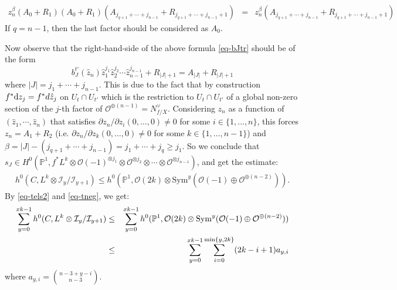 \documentclass[12pt]{amsart}
\theoremstyle{definition}
\def\min{{\rm min}}
\def\dif{{\rm d}}
\def\sym{{\rm Sym}}
\newcommand{\IP}{{\mathbb P}}
\newcommand{\CF}{{\mathcal F}}
\newcommand{\CI}{{\mathcal I}}
\newcommand{\CO}{{\mathcal O}}
\newcommand{\lee}{\leqslant}
\begin{document}
\begin{eqnarray*}\label{eq-bJ2}
    z_n^\beta (A_0+R_1)(A_0+R_1)(A_{j_{q+1}+\cdots+j_{n-1}}+R_{j_{q+1}+\cdots+j_{n-1}+1})
    &=& z_n^\beta (A_{j_{q+1}+\cdots+j_{n-1}}+R_{j_{q+1}+\cdots+j_{n-1}+1})
\end{eqnarray*}
If $q=n-1$, then the last factor should be considered as $A_0$. 

Now observe that the right-hand-side of the above formula \eqref{eq-bJtr} should be of the form $$b_{J}^{t'}(\hat{z}_n)\hat{z}_1^{j_1}\hat{z}_2^{j_2}\cdots \hat{z}_{n-1}^{j_{n-1}}+R_{|J|+1}=A_{|J|}+R_{|J|+1}$$
where $|J|=j_1+\cdots+j_{n-1}$. 
This is due to the fact that by construction $f^* \dif z_j=f^* d\hat{z}_j$ on $U_t\cap U_{t'}$ which is the restriction to $U_t\cap U_{t'}$ of a global non-zero section of the $j$-th factor of $\CO^{\oplus (n-1)}=N_{f/X}^{\vee}$.
Considering $z_n$ as a function of $(\hat{z}_1, \cdots, \hat{z}_n)$ that satisfies $\partial z_n/\partial z_i(0,\dots, 0)\neq 0$ for some $i\in \{1,\dots, n\}$, this forces $z_n=A_1+R_2$ (i.e. $\partial z_n/\partial z_k(0,\dots, 0)\neq 0$ for some $k\in \{1,\dots, n-1\}$) and  $\beta=|J|-(j_{q+1}+\cdots+j_{n-1})=j_1+\cdots+j_{q}\ge j_1$. 
So we conclude that $s_J\in H^0(\IP^1, f^*L^k\otimes \CO(-1)^{\otimes j_1}\otimes \CO^{\otimes j_2}\otimes \cdots \otimes\CO^{\otimes j_{n-1}})$, and get the estimate:
\begin{eqnarray}\label{eq-tneg}
    h^0(C, L^k\otimes \CI_y/\CI_{y+1})\le h^0(\IP^1, \CO(2k)\otimes \mathrm{Sym}^y(\CO(-1)\oplus \CO^{\oplus(n-2)})). 
\end{eqnarray}
By \eqref{eq-tels2} and \eqref{eq-tneg}, we get:
\begin{eqnarray}\label{eq-tels1}
    \sum_{y=0}^{xk-1} h^0(C, L^k\otimes \CI_y/\CI_{y+1})%
    &\le& \sum_{y=0}^{xk-1} h^0(\IP^1, \CO(2k)\otimes \sym^y(\CO(-1)\oplus \CO^{\oplus(n-2)}))\nonumber \\
    &\le&  \sum_{y=0}^{xk-1}\sum_{i=0}^{\min\{y,2k\}}(2k-i+1)a_{y,i}
\end{eqnarray}
where $a_{y,i}=\binom{n-3+y-i}{n-3}$.
\end{document}

